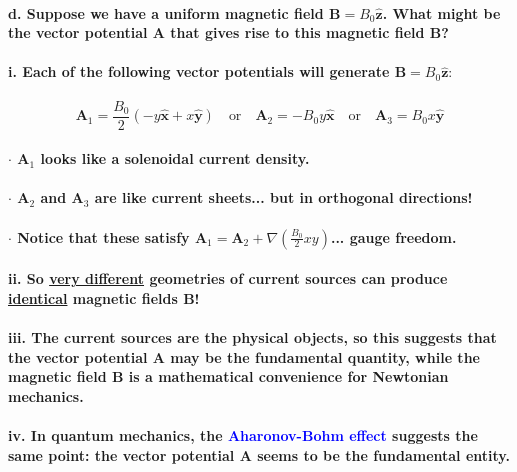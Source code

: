 \documentclass{article}
\begin{document}
\paragraph{\indent d. Suppose we have a uniform magnetic field $\boldsymbol{B}=B_0\hat{\boldsymbol{z}}$. What might be the vector potential $\boldsymbol{A}$ that gives rise to this magnetic field $\boldsymbol{B}$?}
\paragraph{\indent\indent i. Each of the following vector potentials will generate $\boldsymbol{B}=B_0\hat{\boldsymbol{z}}:$}
\begin{equation*}
    \boldsymbol{A}_1=\frac{B_0}{2}(-y\hat{\boldsymbol{x}}+x\hat{\boldsymbol{y}})\quad \text{or}\quad \boldsymbol{A}_2=-B_0y\hat{\boldsymbol{x}}\quad\text{or}\quad \boldsymbol{A}_3=B_0x\hat{\boldsymbol{y}}
\end{equation*}
\paragraph{\indent\indent $\cdot$ $\boldsymbol{A}_1$ looks like a solenoidal current density.}
\paragraph{\indent\indent $\cdot$ $\boldsymbol{A}_2$ and $\boldsymbol{A}_3$ are like current sheets... but in orthogonal directions!}
\paragraph{\indent\indent $\cdot$ Notice that these satisfy $\boldsymbol{A}_1=\boldsymbol{A}_2+\nabla(\frac{B_0}{2}xy)$... gauge freedom.}
\paragraph{\indent\indent ii. So \underline{very different} geometries of current sources can produce \underline{identical} magnetic fields $\boldsymbol{B}$!}
\paragraph{\indent\indent iii. The current sources are the physical objects, so this suggests that the vector potential $\boldsymbol{A}$ may be the fundamental quantity, while the magnetic field $\boldsymbol{B}$ is a mathematical convenience for Newtonian mechanics.}
\paragraph{\indent\indent iv. In quantum mechanics, the \textcolor{blue}{Aharonov-Bohm effect} suggests the same point: the vector potential $\boldsymbol{A}$ seems to be the fundamental entity.}
\end{document}
